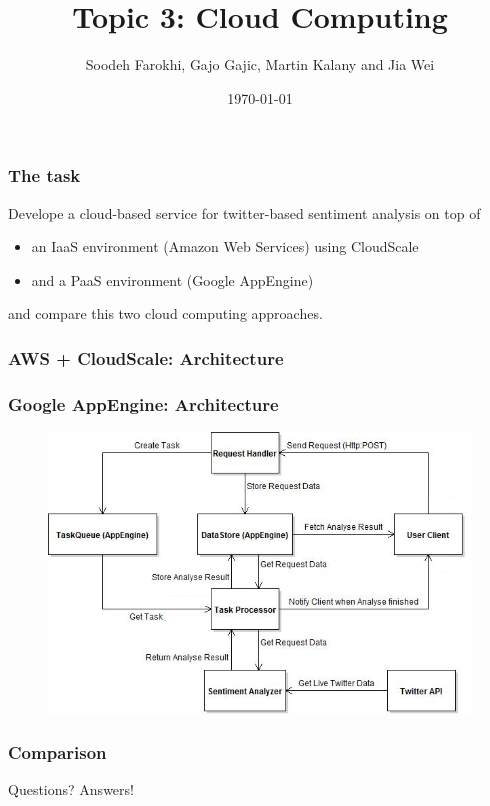 \documentclass{beamer}
\title{Topic 3: Cloud Computing}
\author{Soodeh Farokhi, Gajo Gajic, Martin Kalany and Jia Wei}
\date{\today}
\newcommand\fG[1]{\textcolor{green!80!black}{#1}}
\newcommand\fR[1]{\textcolor{red!80!black}{#1}}
\begin{document}
\frame{\titlepage}

\begin{frame}
\frametitle{The task}

Develope a cloud-based service for twitter-based sentiment analysis on top of
\begin{itemize}
\item an IaaS environment (Amazon Web Services) using CloudScale
\item and a PaaS environment (Google AppEngine)
\end{itemize}

and compare this two cloud computing approaches.

\end{frame}
  
\begin{frame}
\frametitle{AWS + CloudScale: Architecture}
\end{frame}

\begin{frame}
\frametitle{Google AppEngine: Architecture}
\begin{figure}
 \centerline{\includegraphics[width=1\columnwidth]{AppEngine.png}}
  \label{fig:appengine}
\end{figure}
\end{frame}

\begin{frame}
\frametitle{Comparison}
\end{frame}

\begin{frame}
\fR{Questions?} \fG{Answers!}
\end{frame}
\end{document}
